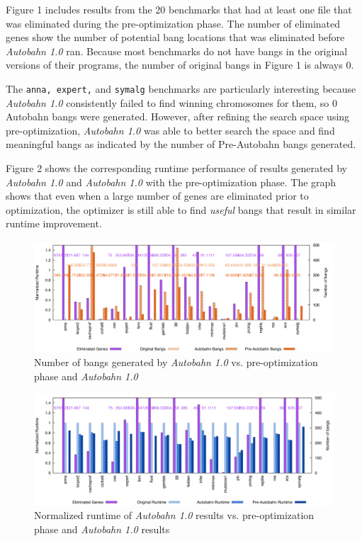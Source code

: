 \documentclass[format=sigplan]{acmart}
\newcommand{\useful}[0]{\textit{useful}}
\newcommand{\Ao}[0]{\textit{Autobahn 1.0}}
\newcommand{\preopt}[0]{pre-optimization}
\begin{document}
Figure 1 includes results from the 20 benchmarks that had at least one file that was eliminated during the \preopt{} phase. The number of eliminated genes show the number of potential bang locations that was eliminated before \Ao{} ran. Because most benchmarks do not have bangs in the original versions of their programs, the number of original bangs in Figure 1 is always 0. 

The \texttt{anna, expert,} and \texttt{symalg} benchmarks are particularly interesting because \Ao{} consistently failed to find winning chromosomes for them, so 0 Autobahn bangs were generated. However, after refining the search space using \preopt{}, \Ao{} was able to better search the space and find meaningful bangs as indicated by the number of Pre-Autobahn bangs generated. 

Figure 2 shows the corresponding runtime performance of results generated by \Ao{} and \Ao{} with the \preopt{} phase. The graph shows that even when a large number of genes are eliminated prior to optimization, the optimizer is still able to find \useful{} bangs that result in similar runtime improvement.  

\begin{figure}
\includegraphics[width=\textwidth]{preAut1}
\caption{Number of bangs generated by \Ao{} vs. \preopt{} phase and \Ao{}}
\end{figure}

\begin{figure}
\includegraphics[width=\textwidth]{preAut2}
\caption{Normalized runtime of \Ao{} results vs. \preopt{} phase and \Ao{} results}
\end{figure}
\end{document}
